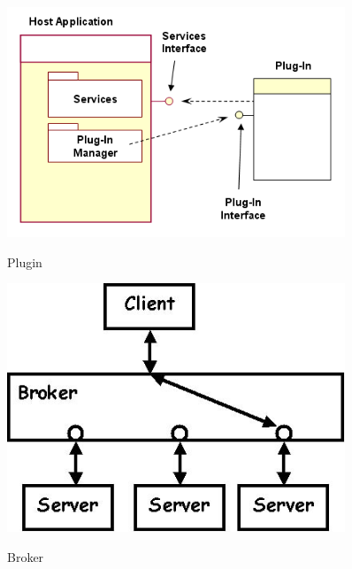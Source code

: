 \begin{figure}[htb]
	\centering
	\begin{minipage}[t]{0.45\linewidth}
		\centering
		\includegraphics[width=0.9\textwidth]{images/plugin}
		\label{fig:plugin}
		\caption{Plugin}
	\end{minipage}%
	\hfill
	\begin{minipage}[t]{0.45\linewidth}
		\centering
		\includegraphics[width=0.9\textwidth]{images/broker}
		\label{fig:broker}
		\caption{Broker}
	\end{minipage}
\end{figure}

